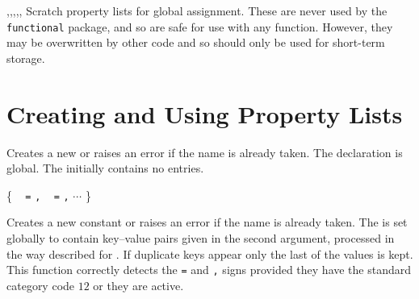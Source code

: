 \documentclass[oneside]{book}
\begin{document}
\begin{variable}{\gTmpaProp,\gTmpbProp,\gTmpcProp,\gTmpiProp,\gTmpjProp,\gTmpkProp}
Scratch property lists for global assignment. These are never used by
the \verb!functional! package, and so are safe for use with any
function. However, they may be overwritten by other
code and so should only be used for short-term storage.
\end{variable}

\section{Creating and Using Property Lists}

\begin{function}{\PropNew}
\begin{syntax}
 
\end{syntax}
Creates a new  or raises an error if the name is
already taken. The declaration is global. The 
initially contains no entries.
\begin{codehigh}
\PropNew \lFooSomeProp
\end{codehigh}
\end{function}

\begin{function}{\PropConstFromKeyval}
\begin{syntax}
 
\{
~  \verb|=|  \verb|,|
~  \verb|=|  \verb|,| $\cdots$
\}
\end{syntax}
Creates a new constant  or raises an error if the
name is already taken. The  is set globally to
contain key--value pairs given in the second argument, processed in
the way described for .  If duplicate
keys appear only the last of the values is kept.
This function correctly detects the \verb|=| and \verb|,| signs provided they
have the standard category code $12$ or they are active.
\begin{codehigh}
\PropConstFromKeyval {}
\end{codehigh}
\end{function}
\end{document}
